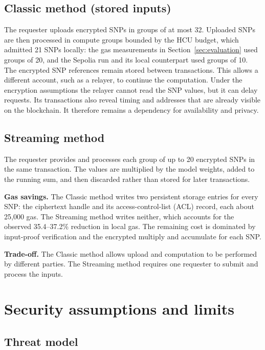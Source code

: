 \documentclass[10pt]{article}
\begin{document}
\subsection{Classic method (stored inputs)}

The requester uploads encrypted SNPs in groups of at most 32.  Uploaded SNPs are then
processed in compute groups bounded by the HCU budget, which admitted 21 SNPs locally:
the gas measurements in Section~\ref{sec:evaluation} used groups of 20, and the Sepolia
run and its local counterpart used groups of 10.  The encrypted SNP references remain
stored between transactions.  This allows a different account, such as a relayer, to
continue the computation.  Under the encryption
assumptions the relayer cannot read the SNP values, but it can delay requests.  Its
transactions also reveal timing and addresses that are already visible on the
blockchain.  It therefore remains a dependency for availability and privacy.

\subsection{Streaming method}

The requester provides and processes each group of up to 20 encrypted SNPs in the same
transaction.  The values are multiplied by the model weights, added to the running sum,
and then discarded rather than stored for later transactions.

\textbf{Gas savings.}
The Classic method writes two persistent storage entries for every SNP: the ciphertext
handle and its access-control-list (ACL) record, each about 25,000 gas.  The Streaming
method writes neither, which accounts for the observed 35.4--37.2\% reduction in local
gas.  The remaining cost is dominated by input-proof verification and the encrypted
multiply and accumulate for each SNP.

\textbf{Trade-off.}
The Classic method allows upload and computation to be performed by different parties.
The Streaming method requires one requester to submit and process the inputs.

\section{Security assumptions and limits}
\label{sec:security}

\subsection{Threat model}
\end{document}
